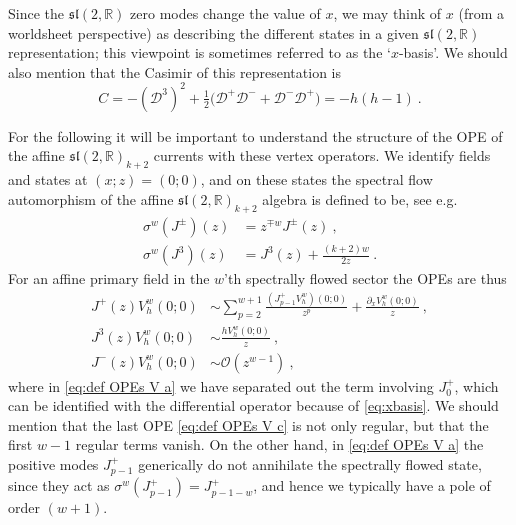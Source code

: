 \documentclass[12pt,a4paper]{article}
\newcommand{\be}{\begin{equation}}
\newcommand{\ee}{\end{equation}}
\begin{document}
Since the $\mathfrak{sl}(2,\mathds{R})$ zero modes change the value of $x$, we may think of $x$ (from a worldsheet perspective) as describing the different states in a given  $\mathfrak{sl}(2,\mathds{R})$ representation; this viewpoint is sometimes referred to as the `$x$-basis'. We should also mention that the Casimir of this representation is 
\be
C = - (\mathcal{D}^3)^2 + \tfrac{1}{2} \bigl( \mathcal{D}^+ \mathcal{D}^- + \mathcal{D}^- \mathcal{D}^+ \bigr) = - h (h-1) \ . 
\ee
\smallskip

For the following it will be important to understand the structure of the OPE of the affine $\mathfrak{sl}(2,\mathds{R})_{k+2}$ currents with these vertex operators. We identify fields and states at $(x;z)=(0;0)$, and on these states the spectral flow automorphism of the affine $\mathfrak{sl}(2,\mathds{R})_{k+2}$ algebra is defined to be, see e.g.\ \cite{Eberhardt:2019qcl}
\begin{align}
\sigma^w(J^\pm)(z)&=z^{\mp w} J^\pm(z)\ , \\
\sigma^w(J^3)(z)&=J^3(z)+\frac{(k+2) w}{2z}\ .
\end{align}
For an affine primary field in the $w$'th spectrally flowed sector the OPEs are thus
\begin{subequations}\label{eq:def OPEs V}
\begin{align} 
J^+(z) V_h^w(0;0)&\sim \sum_{p=2}^{w+1} \frac{(J^+_{p-1} V_h^w)(0;0)}{z^p}+\frac{\partial_x V_h^w(0;0)}{z}\ , \label{eq:def OPEs V a}\\
J^3(z) V_h^w(0;0) &\sim \frac{h V_h^w(0;0)}{z}\ , \label{eq:def OPEs V b}\\
J^-(z) V_h^w(0;0) &\sim \mathcal{O}(z^{w-1})\ , \label{eq:def OPEs V c}
\end{align}
\end{subequations}
where in \eqref{eq:def OPEs V a} we have separated out  the term involving $J^+_0$, which can be identified with the differential operator because of \eqref{eq:xbasis}. We should mention that the last OPE \eqref{eq:def OPEs V c} is not only regular, but that the first $w-1$ regular terms vanish. On the other hand, in \eqref{eq:def OPEs V a} the positive modes $J^+_{p-1}$ generically do not annihilate the spectrally flowed state, since they act as $\sigma^w(J^+_{p-1}) = J^+_{p-1-w}$, and hence we typically have a pole of order $(w+1)$.  
\end{document}
